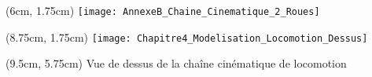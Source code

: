\documentclass[french]{beamer}
\begin{document}
\begin{frame}
\begin{textblock*}{2.25cm}(6cm, 1.75cm)
\centering
\texttt{[image: AnnexeB\_Chaine\_Cinematique\_2\_Roues]}
\end{textblock*}

\begin{textblock*}{4cm}(8.75cm, 1.75cm)
\centering
\texttt{[image: Chapitre4\_Modelisation\_Locomotion\_Dessus]}
\end{textblock*}
\begin{textblock*}{3cm}(9.5cm, 5.75cm)
\centering
\tiny{Vue de dessus de la chaîne cinématique de locomotion}
\end{textblock*}

\end{frame}
\end{document}
